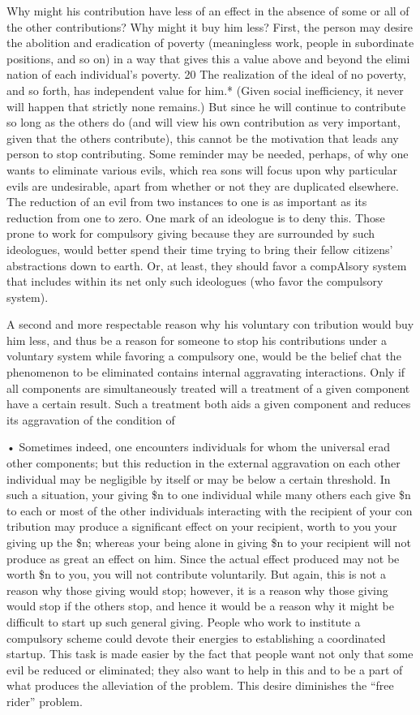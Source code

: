 \documentclass[11pt,openany]{book}
\begin{document}
Why might his contribution have less of an effect in the absence of some or all of the other contributions? Why might it buy him less? First, the person may desire the abolition and eradication of poverty (meaningless work, people in subordinate positions, and so on) in a way that gives this a value above and beyond the elimi nation of each individual's poverty. 20 The realization of the ideal of no poverty, and so forth, has independent value for him.* (Given social inefficiency, it never will happen that strictly none remains.) But since he will continue to contribute so long as the others do (and will view his own contribution as very important, given that the others contribute), this cannot be the motivation that leads any person to stop contributing. Some reminder may be needed, perhaps, of why one wants to eliminate various evils, which rea sons will focus upon why particular evils are undesirable, apart from whether or not they are duplicated elsewhere. The reduction of an evil from two instances to one is as important as its reduction from one to zero. One mark of an ideologue is to deny this. Those prone to work for compulsory giving because they are surrounded by such ideologues, would better spend their time trying to bring their fellow citizens' abstractions down to earth. Or, at least, they should favor a compAlsory system that includes within its net only such ideologues (who favor the compulsory system). 

A second and more respectable reason why his voluntary con tribution would buy him less, and thus be a reason for someone to stop his contributions under a voluntary system while favoring a compulsory one, would be the belief chat the phenomenon to be eliminated contains internal aggravating interactions. Only if all components are simultaneously treated will a treatment of a given component have a certain result. Such a treatment both aids a given component and reduces its aggravation of the condition of 

• Sometimes indeed, one encounters individuals for whom the universal erad other components; but this reduction in the external aggravation on each other individual may be negligible by itself or may be below a certain threshold. In such a situation, your giving \$n to one individual while many others each give \$n to each or most of the other individuals interacting with the recipient of your con tribution may produce a significant effect on your recipient, worth to you your giving up the \$n; whereas your being alone in giving \$n to your recipient will not produce as great an effect on him. Since the actual effect produced may not be worth \$n to you, you will not contribute voluntarily. But again, this is not a reason why those giving would stop; however, it is a reason why those giving would stop if the others stop, and hence it would be a reason why it might be difficult to start up such general giving. People who work to institute a compulsory scheme could devote their energies to establishing a coordinated startup. This task is made easier by the fact that people want not only that some evil be reduced or eliminated; they also want to help in this and to be a part of what produces the alleviation of the problem. This desire diminishes the ``free rider'' problem. 
\end{document}
